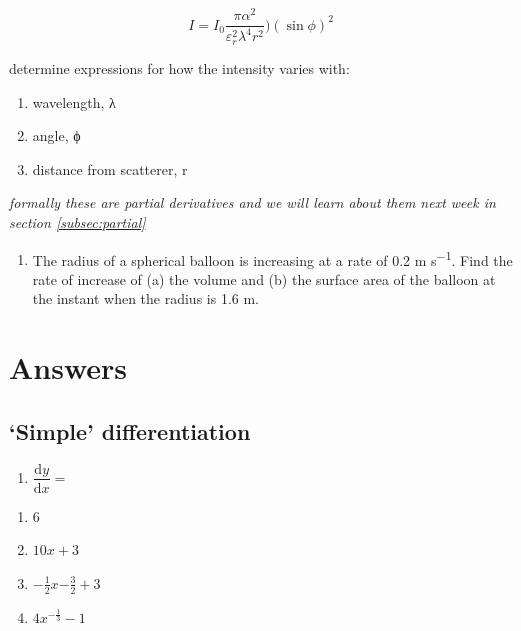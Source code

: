 \documentclass[
]{book}
\providecommand{\tightlist}{%
  \setlength{\itemsep}{0pt}\setlength{\parskip}{0pt}}
\begin{document}
\begin{equation*}
I = I_0 \frac{\pi \alpha ^2}{\varepsilon _r^2 \lambda^4 r^2})(\sin \phi)^2
\end{equation*}

determine expressions for how the intensity varies with:

\begin{enumerate}
\def\labelenumi{\alph{enumi}.}
\tightlist
\item
  wavelength, λ
\item
  angle, ϕ
\item
  distance from scatterer, r
\end{enumerate}

\emph{formally these are partial derivatives and we will learn about them next week in section \ref{subsec:partial}}

\begin{enumerate}
\def\labelenumi{\arabic{enumi}.}
\setcounter{enumi}{2}
\tightlist
\item
  The radius of a spherical balloon is increasing at a rate of 0.2 m s\textsuperscript{−1}. Find the rate of increase of (a) the volume and (b) the surface area of the balloon at the instant when the radius is 1.6 m.
\end{enumerate}

\hypertarget{sec:Answers4}{%
\section{Answers}\label{sec:Answers4}}

\hypertarget{simple-differentiation-1}{%
\subsection{`Simple' differentiation}\label{simple-differentiation-1}}

\begin{enumerate}
\def\labelenumi{\arabic{enumi}.}
\tightlist
\item
  \(\dfrac{\textrm{d}y}{\textrm{d}x}=\)
\end{enumerate}

\begin{enumerate}
\def\labelenumi{\alph{enumi}.}
\tightlist
\item
  6
\item
  \(10x+3\)
\item
  \(-\frac{1}{2}x{-\frac{3}{2}}+3\)
\item
  \(4x^{-\frac{1}{3}}-1\)
\end{enumerate}
\end{document}
